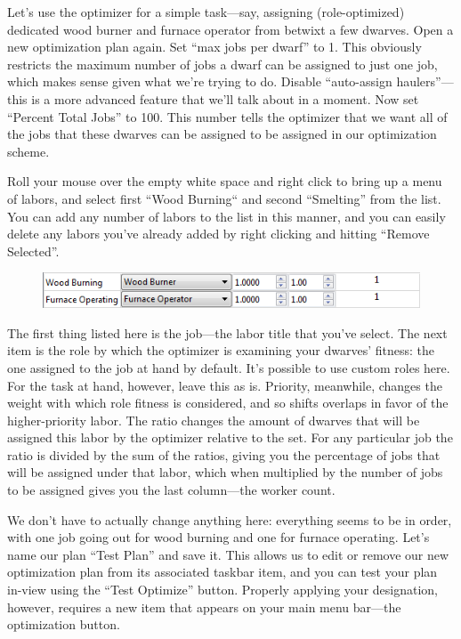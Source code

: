 \documentclass[]{article}
\begin{document}
Let's use the optimizer for a simple task---say, assigning  (role-optimized) dedicated wood burner and
furnace operator from betwixt a few dwarves. Open a new optimization plan again. Set ``max jobs per dwarf''
to 1. This obviously restricts the maximum number of jobs a dwarf can be assigned to just one job, which
makes sense given what we're trying to do. Disable ``auto-assign haulers''---this is a more advanced
feature that we'll talk about in a moment. Now set ``Percent Total Jobs'' to 100. This number tells the
optimizer that we want all of the jobs that these dwarves can be assigned to be assigned in our
optimization scheme.

Roll your mouse over the empty white space and right click to bring up a menu of labors, and select first
``Wood Burning`` and second ``Smelting'' from the list. You can add any number of labors to the list in
this manner, and you can easily delete any labors you've already added by right clicking and hitting
``Remove Selected''.

\begin{figure}[h!]
\centering
\includegraphics[scale=1]{Sec4Fig7}
\end{figure}

The first thing listed here is the job---the labor title that you've select. The next item is the role by
which the optimizer is examining your dwarves' fitness: the one assigned to the job at hand by default.
It's possible to use custom roles here. For the task at hand, however, leave this as is. Priority,
meanwhile, changes the weight with which role fitness is considered, and so shifts overlaps in favor of
the higher-priority labor. The ratio changes the amount of dwarves that will be
assigned this labor by the optimizer relative to the set. For any particular job the ratio is
divided by the sum of the ratios, giving you the percentage of jobs that will be assigned under that
labor, which when multiplied by the number of jobs to be assigned gives you the last column---the worker
count.

We don't have to actually change anything here: everything seems to be in order, with one job going out
for wood burning and one for furnace operating. Let's name our plan ``Test Plan'' and save it. This allows
us to edit or remove our new optimization plan from its associated taskbar item, and you can test your
plan in-view using the ``Test Optimize'' button. Properly applying your designation, however,
requires a new item that appears on your main menu bar---the optimization button.
\end{document}
